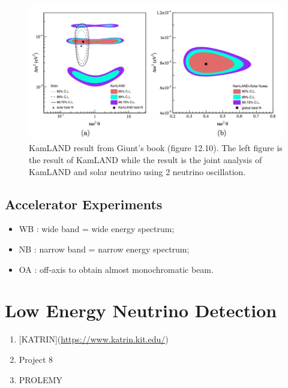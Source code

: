 \documentclass[letterpaper,12pt,english]{sphinxmanual}
\begin{document}
\begin{figure}[htbp]
\centering
\capstart

\includegraphics{kamLANDResults.png}
\caption{KamLAND result from  Giunt's book (figure 12.10). The left figure is the result of KamLAND while the result is the joint analysis of KamLAND and solar neutrino using 2 neutrino oscillation.}\end{figure}


\subsection{Accelerator Experiments}
\label{experiments:accelerator-experiments}\begin{itemize}
\item {} 
WB : wide band = wide energy spectrum;

\item {} 
NB : narrow band = narrow energy spectrum;

\item {} 
OA : off-axis to obtain almost monochromatic beam.

\end{itemize}


\section{Low Energy Neutrino Detection}
\label{experiments:low-energy-neutrino-detection}\begin{enumerate}
\item {} 
{[}KATRIN{]}(\href{https://www.katrin.kit.edu/}{https://www.katrin.kit.edu/})

\item {} 
Project 8

\item {} 
PROLEMY

\end{enumerate}
\end{document}
